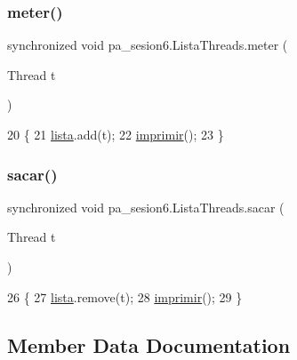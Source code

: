 \subsubsection{\texorpdfstring{meter()}{meter()}}
{\footnotesize\ttfamily synchronized void pa\+\_\+sesion6.\+Lista\+Threads.\+meter (\begin{DoxyParamCaption}\item[{Thread}]{t }\end{DoxyParamCaption})\hspace{0.3cm}{\ttfamily [inline]}}


\begin{DoxyCode}
20     \{
21         \mbox{\hyperlink{classpa__sesion6_1_1_lista_threads_a934ff238b8937623cc1a047bc9860605}{lista}}.add(t);
22         \mbox{\hyperlink{classpa__sesion6_1_1_lista_threads_ae469a3e62adee9a81540a7e1c80602bb}{imprimir}}();
23     \}
\end{DoxyCode}
\mbox{\label{classpa__sesion6_1_1_lista_threads_a750595ae1fea92fc8270776a0aebaa58}} 
\subsubsection{\texorpdfstring{sacar()}{sacar()}}
{\footnotesize\ttfamily synchronized void pa\+\_\+sesion6.\+Lista\+Threads.\+sacar (\begin{DoxyParamCaption}\item[{Thread}]{t }\end{DoxyParamCaption})\hspace{0.3cm}{\ttfamily [inline]}}


\begin{DoxyCode}
26     \{
27         \mbox{\hyperlink{classpa__sesion6_1_1_lista_threads_a934ff238b8937623cc1a047bc9860605}{lista}}.remove(t);
28         \mbox{\hyperlink{classpa__sesion6_1_1_lista_threads_ae469a3e62adee9a81540a7e1c80602bb}{imprimir}}();
29     \}
\end{DoxyCode}


\subsection{Member Data Documentation}
\mbox{\label{classpa__sesion6_1_1_lista_threads_a934ff238b8937623cc1a047bc9860605}} 
